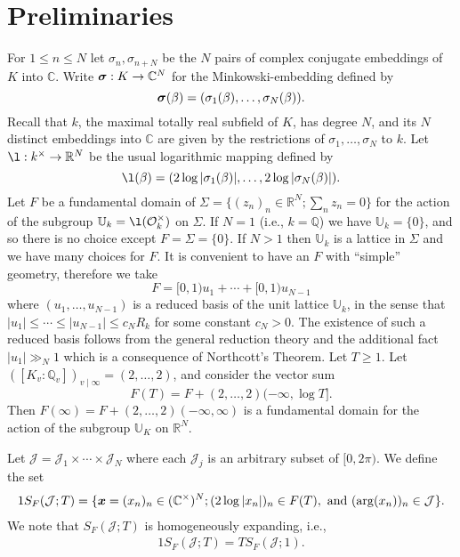 \documentclass[11pt]{amsart}
\numberwithin{equation}{eqncounter}
\def\IR{\mathbb R}
\def\IC{\mathbb C}
\def\IQ{\mathbb Q}
\def\IU{\mathbb U}
\def\J{\mathcal{J}}
\renewcommand{\vec}[1]{\mbox{\boldmath$#1$}}
\def\Oseen{{\mathcal{O}}}
\def\bx{\vec{x}}
\def\bsigma{{\vec{\sigma}}}
\begin{document}
\section{Preliminaries}\label{sec: prelim}
For $1\leq n\leq N$ let $\sigma_n,\sigma_{n+N}$ be the $N$ pairs of complex conjugate embeddings of $K$ into $\IC$.
Write $\bsigma:K\to \IC^N$ for the Minkowski-embedding defined by 
$$\bsigma(\beta)=(\sigma_1(\beta),\ldots,\sigma_N(\beta)).$$
Recall that $k$,  the maximal totally real subfield of $K$, has degree $N$,
and its $N$ distinct embeddings into $\IC$ are given by the restrictions of  $\sigma_1,\ldots, \sigma_N$ to $k$. 
Let $\l:k^\times\to \IR^N$ be the usual logarithmic mapping defined by 
$$\l(\beta)=(2\log|\sigma_1(\beta)|,\ldots, 2\log|\sigma_N(\beta)|).$$ 
Let $F$ be a fundamental domain of $\Sigma=\{(z_n)_n\in \IR^N; \sum_n z_n=0\}$ for the action of
the subgroup $\IU_k=\l(\Oseen_k^\times)$ on $\Sigma$.
If $N=1$ (i.e., $k=\IQ$) we have $\IU_k=\{0\}$, and so there is no choice except $F=\Sigma=\{0\}$.
If $N>1$ then $\IU_k$ is a lattice in $\Sigma$ and we have many choices  for $F$. It is convenient to have an $F$ with ``simple'' geometry, therefore we take  
$$F=[0,1)u_1+\cdots +[0,1)u_{N-1}$$ 
where $(u_1,\ldots, u_{N-1})$ is a reduced basis of the unit lattice $\IU_k$, in the sense that $|u_1|\leq \cdots \leq |u_{N-1}|\leq c_N R_k$ for
some constant $c_N>0$. The existence of such a reduced basis follows from the general reduction theory and the additional fact $|u_1|\gg_N 1$ which is a consequence
of Northcott's Theorem.
Let $T\geq 1$. Let $([K_v:\IQ_v])_{v\mid \infty}=(2,\ldots,2)$, and
consider the vector sum
$$F(T)=F+(2,\ldots,2)(-\infty,\log T].$$ 
Then
$F(\infty)=F+(2,\ldots,2)(-\infty,\infty)$ is a fundamental domain for the action of the subgroup $\IU_K$ on $\IR^N$.



Let $\J=\J_1\times \cdots \times \J_N$ where each $\J_j$ is an arbitrary subset of $[0,2\pi)$.
We define the set
\begin{alignat}1\label{set: SF}
S_F(\J;T)=\{\bx=(x_n)_n\in (\IC^\times)^N; (2\log|x_n|)_n\in F(T), \text{ and }(\arg(x_n))_n\in \J\}.
\end{alignat}
We note that $S_F(\J;T)$ is homogeneously expanding, i.e.,
\begin{alignat}1\label{eq: SFhom}
S_F(\J;T)=TS_F(\J;1).
\end{alignat}
\end{document}

